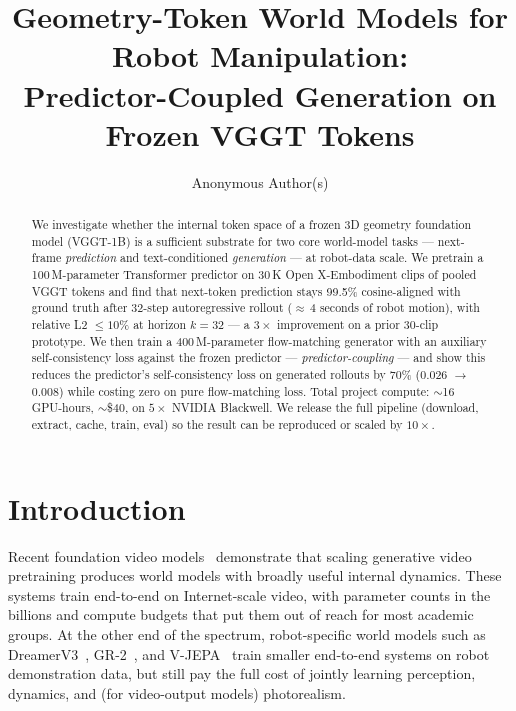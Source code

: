 \documentclass[10pt,letterpaper]{article}
\title{Geometry-Token World Models for Robot Manipulation:\\
Predictor-Coupled Generation on Frozen VGGT Tokens}
\author{Anonymous Author(s)}
\affil{\TODO{affiliation}}
\date{}
\begin{document}
\maketitle

\begin{abstract}
We investigate whether the internal token space of a frozen 3D geometry foundation model (VGGT-1B) is a sufficient substrate for two core world-model tasks --- next-frame \textit{prediction} and text-conditioned \textit{generation} --- at robot-data scale. We pretrain a 100\,M-parameter Transformer predictor on 30\,K Open X-Embodiment clips of pooled VGGT tokens and find that next-token prediction stays 99.5\% cosine-aligned with ground truth after 32-step autoregressive rollout ($\approx$\,4 seconds of robot motion), with relative L2 $\leq 10\%$ at horizon $k=32$ --- a $3\times$ improvement on a prior 30-clip prototype. We then train a 400\,M-parameter flow-matching generator with an auxiliary self-consistency loss against the frozen predictor --- \textit{predictor-coupling} --- and show this reduces the predictor's self-consistency loss on generated rollouts by 70\% (0.026 $\to$ 0.008) while costing zero on pure flow-matching loss. Total project compute: $\sim$16 GPU-hours, $\sim$\$40, on $5\times$ NVIDIA Blackwell. We release the full pipeline (download, extract, cache, train, eval) so the result can be reproduced or scaled by $10\times$.
\end{abstract}

\section{Introduction}

Recent foundation video models~\citep{openai_sora_2024,deepmind_veo3_2024,cosmos_2024} demonstrate that scaling generative video pretraining produces world models with broadly useful internal dynamics. These systems train end-to-end on Internet-scale video, with parameter counts in the billions and compute budgets that put them out of reach for most academic groups. At the other end of the spectrum, robot-specific world models such as DreamerV3~\citep{dreamerv3_2023}, GR-2~\citep{gr2_2024}, and V-JEPA~\citep{vjepa_2024} train smaller end-to-end systems on robot demonstration data, but still pay the full cost of jointly learning perception, dynamics, and (for video-output models) photorealism.
\end{document}
